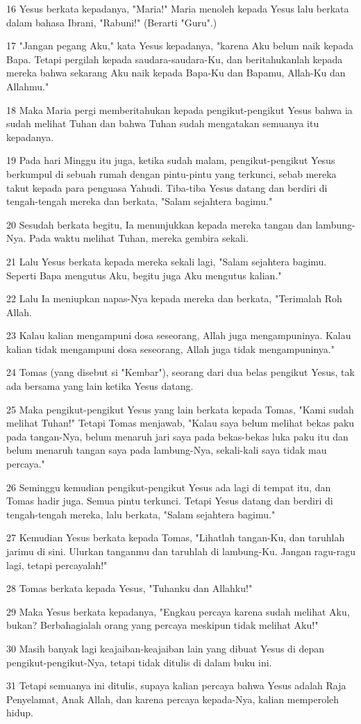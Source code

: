 \par 16 Yesus berkata kepadanya, "Maria!" Maria menoleh kepada Yesus lalu berkata dalam bahasa Ibrani, "Rabuni!" (Berarti "Guru".)
\par 17 "Jangan pegang Aku," kata Yesus kepadanya, "karena Aku belum naik kepada Bapa. Tetapi pergilah kepada saudara-saudara-Ku, dan beritahukanlah kepada mereka bahwa sekarang Aku naik kepada Bapa-Ku dan Bapamu, Allah-Ku dan Allahmu."
\par 18 Maka Maria pergi memberitahukan kepada pengikut-pengikut Yesus bahwa ia sudah melihat Tuhan dan bahwa Tuhan sudah mengatakan semuanya itu kepadanya.
\par 19 Pada hari Minggu itu juga, ketika sudah malam, pengikut-pengikut Yesus berkumpul di sebuah rumah dengan pintu-pintu yang terkunci, sebab mereka takut kepada para penguasa Yahudi. Tiba-tiba Yesus datang dan berdiri di tengah-tengah mereka dan berkata, "Salam sejahtera bagimu."
\par 20 Sesudah berkata begitu, Ia menunjukkan kepada mereka tangan dan lambung-Nya. Pada waktu melihat Tuhan, mereka gembira sekali.
\par 21 Lalu Yesus berkata kepada mereka sekali lagi, "Salam sejahtera bagimu. Seperti Bapa mengutus Aku, begitu juga Aku mengutus kalian."
\par 22 Lalu Ia meniupkan napas-Nya kepada mereka dan berkata, "Terimalah Roh Allah.
\par 23 Kalau kalian mengampuni dosa seseorang, Allah juga mengampuninya. Kalau kalian tidak mengampuni dosa seseorang, Allah juga tidak mengampuninya."
\par 24 Tomas (yang disebut si "Kembar"), seorang dari dua belas pengikut Yesus, tak ada bersama yang lain ketika Yesus datang.
\par 25 Maka pengikut-pengikut Yesus yang lain berkata kepada Tomas, "Kami sudah melihat Tuhan!" Tetapi Tomas menjawab, "Kalau saya belum melihat bekas paku pada tangan-Nya, belum menaruh jari saya pada bekas-bekas luka paku itu dan belum menaruh tangan saya pada lambung-Nya, sekali-kali saya tidak mau percaya."
\par 26 Seminggu kemudian pengikut-pengikut Yesus ada lagi di tempat itu, dan Tomas hadir juga. Semua pintu terkunci. Tetapi Yesus datang dan berdiri di tengah-tengah mereka, lalu berkata, "Salam sejahtera bagimu."
\par 27 Kemudian Yesus berkata kepada Tomas, "Lihatlah tangan-Ku, dan taruhlah jarimu di sini. Ulurkan tanganmu dan taruhlah di lambung-Ku. Jangan ragu-ragu lagi, tetapi percayalah!"
\par 28 Tomas berkata kepada Yesus, "Tuhanku dan Allahku!"
\par 29 Maka Yesus berkata kepadanya, "Engkau percaya karena sudah melihat Aku, bukan? Berbahagialah orang yang percaya meskipun tidak melihat Aku!"
\par 30 Masih banyak lagi keajaiban-keajaiban lain yang dibuat Yesus di depan pengikut-pengikut-Nya, tetapi tidak ditulis di dalam buku ini.
\par 31 Tetapi semuanya ini ditulis, supaya kalian percaya bahwa Yesus adalah Raja Penyelamat, Anak Allah, dan karena percaya kepada-Nya, kalian memperoleh hidup.

